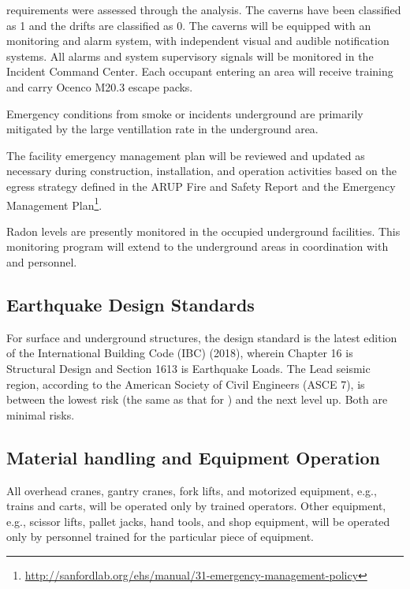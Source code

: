  requirements were assessed through the 
 analysis. The caverns have been classified as  1 and
the drifts are classified as   0. The caverns will be equipped with
an  monitoring and alarm system, with independent visual and
audible notification systems.  All  alarms and system
supervisory signals will be monitored in the  Incident
Command Center.  Each occupant entering an   area will receive  
training and carry Ocenco M20.3 escape packs.

Emergency conditions from smoke or  incidents underground are
primarily mitigated by the large ventillation rate in the 
underground area.

The facility emergency management plan will be reviewed and updated as
necessary during construction, installation, and operation activities
based on the egress strategy defined in the ARUP Fire and Safety
Report and the   Emergency Management
  Plan\footnote{\url{http://sanfordlab.org/ehs/manual/31-emergency-management-policy}}.

Radon levels are presently monitored in the occupied underground
facilities. This monitoring program will extend to the 
underground areas in coordination with  and 
 personnel.

\subsection{Earthquake Design Standards}

For surface and underground structures, the design standard is the
latest edition of the International Building Code (IBC) (2018), wherein
Chapter 16  is Structural Design and Section 1613 is Earthquake
Loads. The Lead seismic region, according to the American Society of
Civil Engineers (ASCE 7), is between the lowest risk (the same as that 
for \fnal) and the next level up. Both are minimal risks.

\subsection{Material handling and Equipment Operation}

All overhead cranes, gantry cranes, fork lifts, and motorized equipment,
e.g., trains and carts, will be operated only by trained
operators. Other equipment, e.g., scissor lifts, pallet jacks, hand
tools, and shop equipment, will be operated only by personnel trained
for the particular piece of equipment. 

